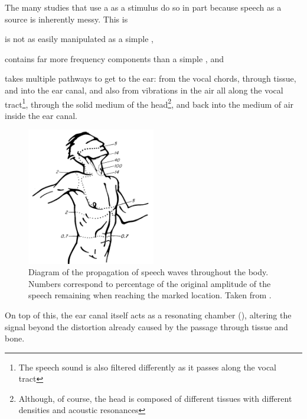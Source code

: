 The many studies that use a \DIFdelbegin {}\DIFdelend \DIFaddbegin {}\DIFaddend as a stimulus do so in part because \DIFdelbegin {}\DIFdelend \DIFaddbegin {}\DIFaddend speech as a source is inherently messy.  This is \DIFdelbegin {}\DIFdelend \DIFaddbegin {}\DIFaddend \begin{enumerate*}[label={\alph*)}]
  \item  is not as easily manipulated as a simple \DIFdelbegin {}\DIFdelend \DIFaddbegin {}\DIFaddend ,
  \item  contains far more frequency components than a simple \DIFdelbegin {}\DIFdelend \DIFaddbegin {}\DIFaddend , and 
  \item  takes multiple pathways to get to the ear: from the vocal chords, through tissue, and into the ear canal, and also from vibrations in the air all along the vocal tract\footnote{The speech sound is also filtered differently as it passes along the vocal tract}, through the solid medium of the head\footnote{Although, of course, the head is composed of different tissues with different densities and acoustic resonances}, and back into the medium of air inside the ear canal.
\end{enumerate*}
% 
\begin{figure}
\centering
  \includegraphics[width=0.5\textwidth]{figure/bekesy60-3b.png}
  \caption{Diagram of the propagation of speech waves throughout the body. Numbers correspond to percentage of the original amplitude of the speech remaining when reaching the marked location. Taken from \cite{bekesy:60}.}
  \label{fig:bekesyBodyTransfer}
\end{figure}
%
On top of this, the ear canal itself acts as a resonating chamber (\cite{rosen:91}), altering the signal beyond the distortion already caused by the passage through tissue and bone.  



